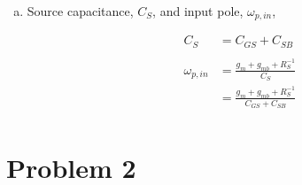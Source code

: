 \documentclass{article}
\begin{document}
\begin{enumerate}[(a)]
\item Source capacitance, \(C_{S}\), and input pole, \(\omega_{p, in}\),

\begin{equation*}
\begin{aligned}
C_{S} &= C_{GS} + C_{SB} \\
\\
\omega_{p, in} &= \frac{g_{m} + g_{mb} + R_{S}^{-1}}{C_{S}} \\
&= \frac{g_{m} + g_{mb} + R_{S}^{-1}}{C_{GS} + C_{SB}} \\
\end{aligned}
\end{equation*}
\end{enumerate}

\section{Problem 2}
\label{sec:org6c3ba6c}
\end{document}
